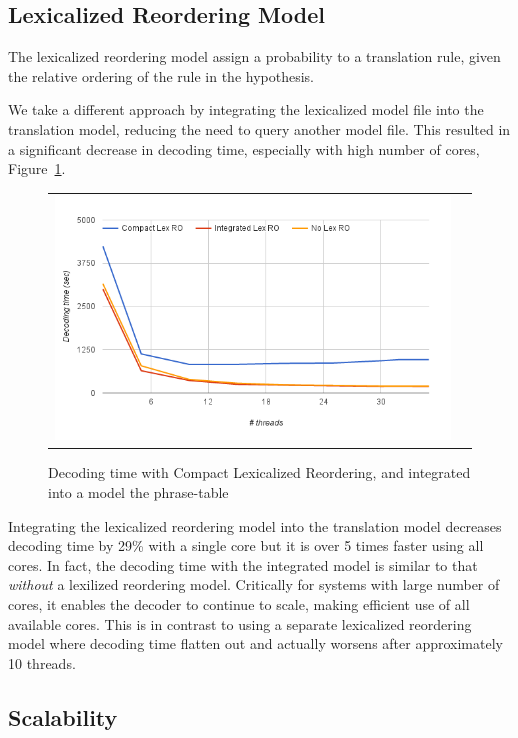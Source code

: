 \documentclass[11pt]{article}
\begin{document}
\subsection{Lexicalized Reordering Model}

The lexicalized reordering model assign a probability to a translation rule, given the relative ordering of the rule in the hypothesis. 

We take a different approach by integrating the lexicalized model file into the translation model, reducing the need to query another model file. This resulted in a significant decrease in decoding time, especially with high number of cores, Figure~\ref{fig:lex-ro}. 
\begin{figure}[h]
\centering
\begin{tabular}{cc}
{\includegraphics[scale=0.4]{lex-ro.png}} 
\end{tabular}
\caption{Decoding time with Compact Lexicalized Reordering, and integrated into a model the phrase-table}
\label{fig:lex-ro}
\end{figure} 
Integrating the lexicalized reordering model into the translation model decreases decoding time by 29\% with a single core but it is over 5 times faster using all cores. In fact, the decoding time with the integrated model is similar to that \emph{without} a lexilized reordering model. Critically for systems with large number of cores, it enables the decoder to continue to scale, making efficient use of all available cores. This is in contrast to using a separate lexicalized reordering model where decoding time flatten out and actually worsens after approximately 10 threads.

\subsection{Scalability}
\end{document}
